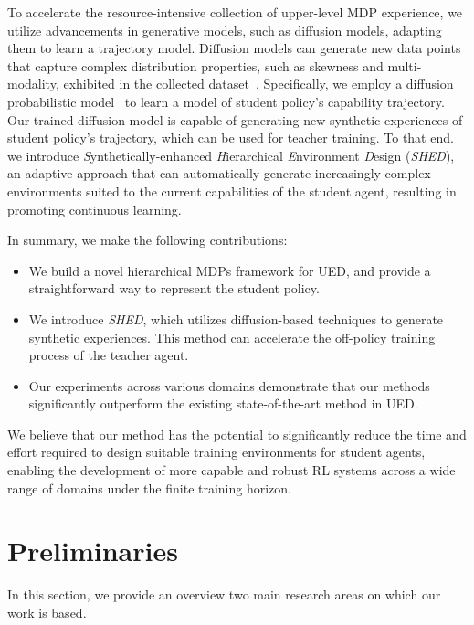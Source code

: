 \documentclass{article}
\begin{document}
To accelerate the resource-intensive collection of upper-level MDP experience, we utilize advancements in generative models, such as diffusion models, adapting them to learn a trajectory model. Diffusion models can  generate new data points that capture complex distribution properties, such as skewness and multi-modality, exhibited in the collected dataset~\citep{saharia2022photorealistic}. Specifically, we employ a diffusion probabilistic model~\citep{sohl2015deep,ho2020denoising} to learn a model of student policy's capability trajectory.
Our trained diffusion model is capable of generating new synthetic experiences of student policy's trajectory, which can be used for teacher training. To that end. we introduce \emph{S}ynthetically-enhanced \emph{H}ierarchical \emph{E}nvironment \emph{D}esign ({\em SHED}), an adaptive approach that can automatically generate increasingly complex environments suited to the current capabilities of the student agent, resulting in promoting continuous learning.

In summary, we make the following contributions:
\begin{itemize}
    \item We build a novel hierarchical MDPs framework for UED, and provide a straightforward way to represent the student policy.
    \item We introduce {\em SHED}, which utilizes diffusion-based techniques to generate synthetic experiences. This method can accelerate the off-policy training process of the teacher agent.
    \item Our experiments across various domains demonstrate that our methods significantly outperform the existing state-of-the-art method in UED.
\end{itemize}
We believe that our method has the potential to significantly reduce the time and effort required to design suitable training environments for student agents, enabling the development of more capable and robust RL systems across a wide range of domains under the finite training horizon.







\section{Preliminaries}

In this section, we provide an overview two main research areas on which our work is based.
\end{document}
